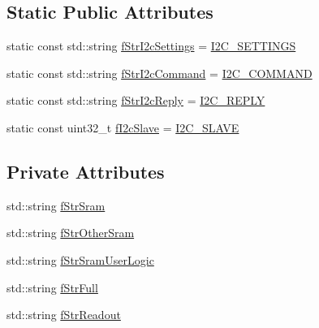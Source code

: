 \subsection*{Static Public Attributes}
\begin{DoxyCompactItemize}
\item 
static const std\-::string \hyperlink{class_ph2___hw_interface_1_1_c_b_c_interface_a3e1a76026b451e23697eb1eecdf8c912}{f\-Str\-I2c\-Settings} = \hyperlink{_cbc_interface_8cc_a15db09e24617ea5c5843213672ac8a03}{I2\-C\-\_\-\-S\-E\-T\-T\-I\-N\-G\-S}
\item 
static const std\-::string \hyperlink{class_ph2___hw_interface_1_1_c_b_c_interface_a2c72e9920d45e1df938f582a095196d4}{f\-Str\-I2c\-Command} = \hyperlink{_cbc_interface_8cc_ae308275dafb538f2511ea285fea768d0}{I2\-C\-\_\-\-C\-O\-M\-M\-A\-N\-D}
\item 
static const std\-::string \hyperlink{class_ph2___hw_interface_1_1_c_b_c_interface_a583ceda969e6d70c981cad62af51f567}{f\-Str\-I2c\-Reply} = \hyperlink{_cbc_interface_8cc_a46aaa2293185dfc3cd655f65bea7f614}{I2\-C\-\_\-\-R\-E\-P\-L\-Y}
\item 
static const uint32\-\_\-t \hyperlink{class_ph2___hw_interface_1_1_c_b_c_interface_a5222dcc6e69a64dcef874d622136e994}{f\-I2c\-Slave} = \hyperlink{_cbc_interface_8cc_ab15137f7c592d05573de99f078516157}{I2\-C\-\_\-\-S\-L\-A\-V\-E}
\end{DoxyCompactItemize}
\subsection*{Private Attributes}
\begin{DoxyCompactItemize}
\item 
std\-::string \hyperlink{class_ph2___hw_interface_1_1_c_b_c_interface_a19496098840524d937006e847a82ab37}{f\-Str\-Sram}
\item 
std\-::string \hyperlink{class_ph2___hw_interface_1_1_c_b_c_interface_a23c250eabca85a5cb7042dca0f3be50c}{f\-Str\-Other\-Sram}
\item 
std\-::string \hyperlink{class_ph2___hw_interface_1_1_c_b_c_interface_ac74f8185e2194b9697833c5307d031ea}{f\-Str\-Sram\-User\-Logic}
\item 
std\-::string \hyperlink{class_ph2___hw_interface_1_1_c_b_c_interface_ad7cefdc3aade4b4ddc9d63fee1f09b1e}{f\-Str\-Full}
\item 
std\-::string \hyperlink{class_ph2___hw_interface_1_1_c_b_c_interface_a1f52dd280bb04707d890526be58b56ba}{f\-Str\-Readout}
\end{DoxyCompactItemize}
